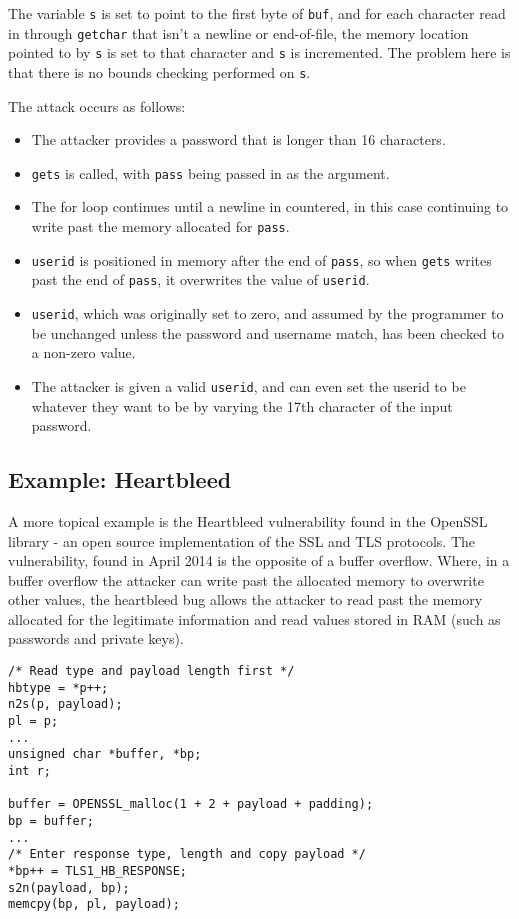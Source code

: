 The variable \verb!s! is set to point to the first byte of \verb!buf!, and for each character read in through \verb!getchar! that isn't a newline or end-of-file, the memory location pointed to by \verb!s! is set to that character and \verb!s! is incremented.
The problem here is that there is no bounds checking performed on \verb!s!.

The attack occurs as follows:

\begin{itemize}
\item The attacker provides a password that is longer than 16 characters.
\item \verb!gets! is called, with \verb!pass! being passed in as the argument.
\item The for loop continues until a newline in countered, in this case continuing to write past the memory allocated for \verb!pass!.
\item \verb!userid! is positioned in memory after the end of \verb!pass!, so when \verb!gets! writes past the end of \verb!pass!, it overwrites the value of \verb!userid!.
\item \verb!userid!, which was originally set to zero, and assumed by the programmer to be unchanged unless the password and username match, has been checked to a non-zero value.
\item The attacker is given a valid \verb!userid!, and can even set the userid to be whatever they want to be by varying the 17th character of the input password.
\end{itemize}

\subsection{Example: Heartbleed}

A more topical example is the Heartbleed vulnerability found in the OpenSSL library - an open source implementation of the SSL and TLS protocols.
The vulnerability, found in April 2014 is the opposite of a buffer overflow.
Where, in a buffer overflow the attacker can write past the allocated memory to overwrite other values, the heartbleed bug allows the attacker to read past the memory allocated for the legitimate information and read values stored in RAM (such as passwords and private keys).


\begin{verbatim}
/* Read type and payload length first */
hbtype = *p++;
n2s(p, payload);
pl = p;
...
unsigned char *buffer, *bp;
int r;

buffer = OPENSSL_malloc(1 + 2 + payload + padding);
bp = buffer;
...
/* Enter response type, length and copy payload */
*bp++ = TLS1_HB_RESPONSE;
s2n(payload, bp);
memcpy(bp, pl, payload);
\end{verbatim}

